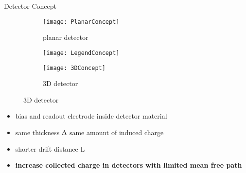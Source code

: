\begin{frame}{Detector Concept}

	\vspace*{-10pt}
	\begin{figure} 
		\begin{center}
			\begin{subfigure}{0.4\textwidth}  
				\centering 
				\texttt{[image: PlanarConcept]}
				\caption{planar detector}
			\end{subfigure}
			\begin{subfigure}{0.1\textwidth}  
				\centering 
				\texttt{[image: LegendConcept]}
				\vspace*{20pt}
			\end{subfigure}
			\begin{subfigure}{0.4\textwidth} 
				\centering 
				\texttt{[image: 3DConcept]}
				\caption{3D detector} 	
			\end{subfigure} 
		\end{center}
	\end{figure}\vspace*{-10pt}
	
	\begin{itemize}
		\itemfill
		\item bias and readout electrode inside detector material
		\item same thickness $\Updelta$ \ra same amount of induced charge
		\item shorter drift distance L
		\item {} \textbf{increase collected charge in detectors with limited mean free path}
	\end{itemize}
	
\end{frame}
